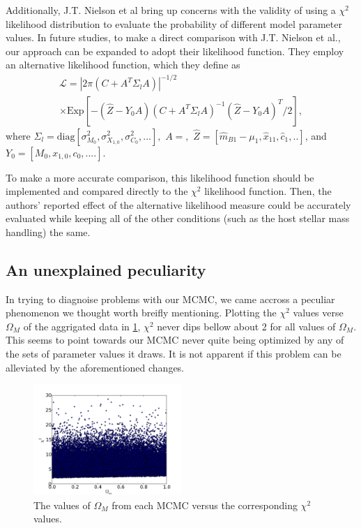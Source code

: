 \documentclass[aps,prl,reprint]{revtex4-1}
\begin{document}
Additionally, J.T. Nielson et al bring up concerns with the validity of using a $\chi^2$ likelihood distribution to evaluate the probability of different model parameter values. In future studies, to make a direct comparison with J.T. Nielson et al., our approach can be expanded to adopt their likelihood function. 
They employ an alternative likelihood function, which they define as \begin{align*}\mathscr{L} = |2\pi(C+A^T \Sigma_l A)|^{-1/2}\; \\
\times \text{Exp}[-(\hat{Z}-Y_0A)(C+A^T\Sigma_lA)^{-1}(\hat{Z}-Y_0A)^T/2],\end{align*} where $\Sigma_l = \text{diag}[\sigma_{M_0}^2,\sigma_{X_{1,0}}^2,\sigma_{C_0}^2,...],$ $A = ,$ $\hat{Z} = [\hat{m}_{B1}-\mu_1, \hat{x}_{11},\hat{c}_1,..]$, and $Y_0 = [M_0,x_{1,0},c_0,....]$. 
\par To make a more accurate comparison, this likelihood function should be implemented and compared directly to the $\chi^2$ likelihood function. Then, the authors' reported effect of the alternative likelihood measure could be accurately evaluated while keeping all of the other conditions (such as the host stellar mass handling) the same. 

\subsection{An unexplained peculiarity}
In trying to diagnoise problems with our MCMC, we came accross a peculiar phenomenon we thought worth breifly mentioning. Plotting the $\chi^2$ values verse $\Omega_M$ of the aggrigated data in \cref{fig:chi2}, $\chi^2$ never dips bellow about 2 for all values of $\Omega_M$. This seems to point towards our MCMC never quite being optimized by any of the sets of parameter values it draws. It is not apparent if this problem can be alleviated by the aforementioned changes. 

\begin{figure}
 \includegraphics[width=0.5\textwidth]{../plots/om_chi.pdf}
\caption{\label{fig:chi2}The values of $\Omega_M$ from each MCMC versus the corresponding $\chi^2$ values.}
\end{figure}
 
 
\end{document}
